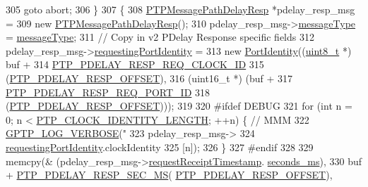 \begin{DoxyCode}
{{{{{{{305             \textcolor{keywordflow}{goto} abort;
306         \}
307         \{
308             \hyperlink{class_p_t_p_message_path_delay_resp}{PTPMessagePathDelayResp} *pdelay\_resp\_msg =
309                 \textcolor{keyword}{new} \hyperlink{class_p_t_p_message_path_delay_resp}{PTPMessagePathDelayResp}();
310             pdelay\_resp\_msg->\hyperlink{class_p_t_p_message_common_adb32627aa5b0e2dbad3ccd88aab07c05}{messageType} = \hyperlink{class_p_t_p_message_common_adb32627aa5b0e2dbad3ccd88aab07c05}{messageType};
311             \textcolor{comment}{// Copy in v2 PDelay Response specific fields}
312             pdelay\_resp\_msg->\hyperlink{class_p_t_p_message_path_delay_resp_a27e69c7fb521ebffca13229a7c4658ce}{requestingPortIdentity} =
313                 \textcolor{keyword}{new} \hyperlink{class_port_identity}{PortIdentity}((\hyperlink{stdint_8h_aba7bc1797add20fe3efdf37ced1182c5}{uint8\_t} *) buf +
314                          \hyperlink{avbts__message_8hpp_a9c01e5eff56f505aca3f6f3deb6c34f1}{PTP\_PDELAY\_RESP\_REQ\_CLOCK\_ID}
315                          (\hyperlink{avbts__message_8hpp_a7c20f0e32d4408c124fa9e115ab32cf3}{PTP\_PDELAY\_RESP\_OFFSET}),
316                          (uint16\_t *) (buf +
317                                \hyperlink{avbts__message_8hpp_a1c5ac861894d1195aa57f60ef085798d}{PTP\_PDELAY\_RESP\_REQ\_PORT\_ID}
318                                (\hyperlink{avbts__message_8hpp_a7c20f0e32d4408c124fa9e115ab32cf3}{PTP\_PDELAY\_RESP\_OFFSET})));
319 
320 \textcolor{preprocessor}{#ifdef DEBUG}
321             \textcolor{keywordflow}{for} (\textcolor{keywordtype}{int} n = 0; n < \hyperlink{ptptypes_8hpp_afd1566058ed7927c2b790c9d4a0051ec}{PTP\_CLOCK\_IDENTITY\_LENGTH}; ++n) \{  \textcolor{comment}{// MMM}
322                 \hyperlink{gptp__log_8hpp_add03384a2a8099b27e07d041cce77e6f}{GPTP\_LOG\_VERBOSE}(\textcolor{stringliteral}{"%
323                     pdelay\_resp\_msg->
324                     \hyperlink{class_p_t_p_message_path_delay_resp_follow_up_a27e69c7fb521ebffca13229a7c4658ce}{requestingPortIdentity}.clockIdentity
325                     [n]);
326             \}
327 \textcolor{preprocessor}{#endif}
328 
329             memcpy(& (pdelay\_resp\_msg->\hyperlink{class_p_t_p_message_path_delay_resp_a981c3fe148ecddf9f1091675650ccd48}{requestReceiptTimestamp}.
      \hyperlink{class_timestamp_a5d98378d782519e6f9c17db70f1620f0}{seconds\_ms}),
330                    buf + \hyperlink{avbts__message_8hpp_a5afc93370bc70d23f95f2acbe53749d8}{PTP\_PDELAY\_RESP\_SEC\_MS}(
      \hyperlink{avbts__message_8hpp_a7c20f0e32d4408c124fa9e115ab32cf3}{PTP\_PDELAY\_RESP\_OFFSET}),
}}}}}}}}
\end{DoxyCode}
